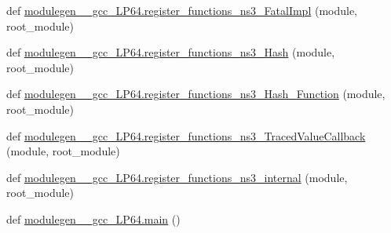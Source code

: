 \begin{DoxyCompactItemize}
\item 
def \hyperlink{namespacemodulegen____gcc__LP64_a50e31627c725d62dd753bad9b750a7a2}{modulegen\+\_\+\+\_\+gcc\+\_\+\+L\+P64.\+register\+\_\+functions\+\_\+ns3\+\_\+\+Fatal\+Impl} (module, root\+\_\+module)
\item 
def \hyperlink{namespacemodulegen____gcc__LP64_aaccaa7a88652c7cf1cbe4bae23dfd70f}{modulegen\+\_\+\+\_\+gcc\+\_\+\+L\+P64.\+register\+\_\+functions\+\_\+ns3\+\_\+\+Hash} (module, root\+\_\+module)
\item 
def \hyperlink{namespacemodulegen____gcc__LP64_ac5702d84dcfdab4237af2580ad57e6cd}{modulegen\+\_\+\+\_\+gcc\+\_\+\+L\+P64.\+register\+\_\+functions\+\_\+ns3\+\_\+\+Hash\+\_\+\+Function} (module, root\+\_\+module)
\item 
def \hyperlink{namespacemodulegen____gcc__LP64_a598936972a1d732adf3c766e058929eb}{modulegen\+\_\+\+\_\+gcc\+\_\+\+L\+P64.\+register\+\_\+functions\+\_\+ns3\+\_\+\+Traced\+Value\+Callback} (module, root\+\_\+module)
\item 
def \hyperlink{namespacemodulegen____gcc__LP64_a630b6ee80068b30f962d5f77d73fd74e}{modulegen\+\_\+\+\_\+gcc\+\_\+\+L\+P64.\+register\+\_\+functions\+\_\+ns3\+\_\+internal} (module, root\+\_\+module)
\item 
def \hyperlink{namespacemodulegen____gcc__LP64_a78c8b268d5fecc4d52d220f8954d0345}{modulegen\+\_\+\+\_\+gcc\+\_\+\+L\+P64.\+main} ()
\end{DoxyCompactItemize}
